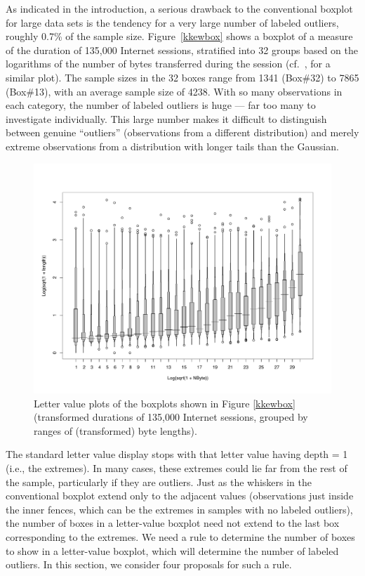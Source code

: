 \documentclass[oneside]{article}
\begin{document}
As indicated in the introduction, a serious drawback to the conventional boxplot for large data sets is the tendency for a very large number of labeled outliers, roughly 0.7\% of the sample size. Figure~\ref{kkewbox} shows a boxplot of a measure of the duration of 135,000 Internet sessions, stratified into 32 groups based on the logarithms of the number of bytes transferred during the session (cf.~\citet{kw06}, for a similar plot). The sample sizes in the 32 boxes range from 1341 (Box\#32) to 7865 (Box\#13), with an average sample size of 4238. With so many observations in each category, the number of labeled outliers is huge --- far too many to investigate individually. This large number makes it difficult to distinguish between genuine ``outliers'' (observations from a different distribution) and merely extreme observations from a distribution with longer tails than the Gaussian.

\begin{figure}[htbp]
  \centering
  \includegraphics[width = 0.75\linewidth]{lvbox2}

  \caption{Letter value plots of the boxplots shown in Figure \ref{kkewbox}
  (transformed durations of 135,000 Internet sessions, grouped by ranges of
  (transformed) byte lengths).}
  \label{kkewlv}

\end{figure}

The standard letter value display stops with that letter value having depth = 1 (i.e., the extremes). In many cases, these extremes could lie far from the rest of the sample, particularly if they are outliers. Just as the whiskers in the conventional boxplot extend only to the adjacent values (observations just inside the inner fences, which can be the extremes in samples with no labeled outliers), the number of boxes in a letter-value boxplot need not extend to the last box corresponding to the extremes. We need a rule to determine the number of boxes to show in a letter-value boxplot, which will determine the number of labeled outliers. In this section, we consider four proposals for such a rule.
\end{document}
